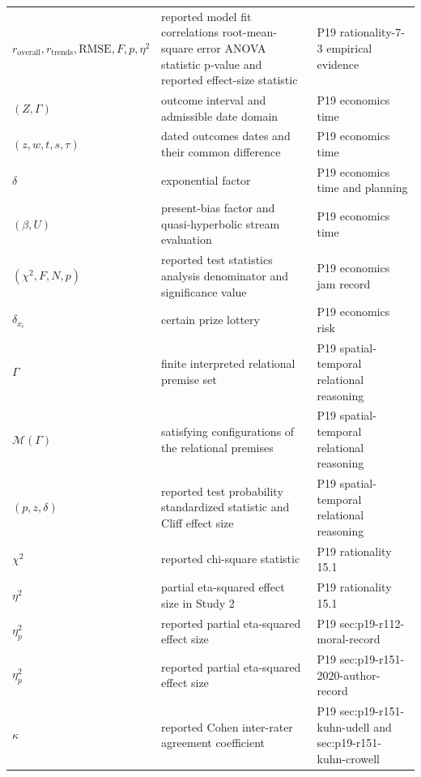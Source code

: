 \begin{longtable}{@{}p{}p{}p{}@{}}
\(r_{\mathrm{overall}},\allowbreak r_{\mathrm{trends}},\allowbreak \mathrm{RMSE},\allowbreak F,\allowbreak p,\allowbreak \eta^2\) & reported model fit correlations root-mean-square error ANOVA statistic p-value and reported effect-size statistic & P19 rationality-\allowbreak{}7-\allowbreak{}3 empirical evidence \\
\((Z,\allowbreak \Gamma)\) & outcome interval and admissible date domain & P19 economics time \\
\((z,\allowbreak w,\allowbreak t,\allowbreak s,\allowbreak \tau)\) & dated outcomes dates and their common difference & P19 economics time \\
\(\delta\) & exponential factor & P19 economics time and planning \\
\((\beta,\allowbreak U)\) & present-bias factor and quasi-hyperbolic stream evaluation & P19 economics time \\
\((\chi^2,\allowbreak F,\allowbreak N,\allowbreak p)\) & reported test statistics analysis denominator and significance value & P19 economics jam record \\
\(\delta_{x_i}\) & certain prize lottery & P19 economics risk \\
\(\Gamma\) & finite interpreted relational premise set & P19 spatial-\allowbreak{}temporal relational reasoning \\
\(\mathcal M(\Gamma)\) & satisfying configurations of the relational premises & P19 spatial-\allowbreak{}temporal relational reasoning \\
\((p,\allowbreak z,\allowbreak \delta)\) & reported test probability standardized statistic and Cliff effect size & P19 spatial-\allowbreak{}temporal relational reasoning \\
\(\chi^2\) & reported chi-square statistic & P19 rationality 15.\allowbreak{}1 \\
\(\eta^2\) & partial eta-squared effect size in Study 2 & P19 rationality 15.\allowbreak{}1 \\
\(\eta_p^2\) & reported partial eta-squared effect size & P19 sec:\allowbreak{}p19-\allowbreak{}r112-\allowbreak{}moral-\allowbreak{}record \\
\(\eta_p^2\) & reported partial eta-squared effect size & P19 sec:\allowbreak{}p19-\allowbreak{}r151-\allowbreak{}2020-\allowbreak{}author-\allowbreak{}record \\
\(\kappa\) & reported Cohen inter-rater agreement coefficient & P19 sec:\allowbreak{}p19-\allowbreak{}r151-\allowbreak{}kuhn-\allowbreak{}udell and sec:\allowbreak{}p19-\allowbreak{}r151-\allowbreak{}kuhn-\allowbreak{}crowell \\

\end{longtable}
